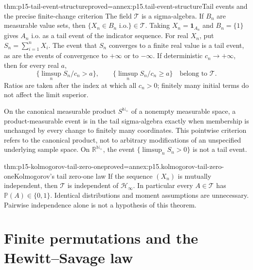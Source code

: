 \begin{hbtheorem}{thm:p15-tail-event-structure}{proved=annex:p15.tail-event-structure}{Tail events and the precise finite-change criterion}
The field \(\mathcal T\) is a sigma-algebra. If \(B_n\) are
measurable value sets, then \(\{X_n\in B_n\text{ i.o.}\}\in\mathcal T\).
Taking \(X_n=\mathbf1_{A_n}\) and \(B_n=\{1\}\) gives
\(A_n\text{ i.o.}\) as a tail event of the indicator sequence.
For real \(X_n\), put \(S_n=\sum_{i=1}^nX_i\). The event that
\(S_n\) converges to a finite real value is a tail event, as are
the events of convergence to \(+\infty\) or to \(-\infty\).
If deterministic \(c_n\to+\infty\), then for every real \(a\),
\[
 \{\limsup_n S_n/c_n>a\},\qquad
 \{\limsup_n S_n/c_n\geq a\}
                         \quad\text{belong to }\mathcal T.
\]
Ratios are taken after the index at which all \(c_n>0\);
finitely many initial terms do not affect the limit superior.

On the canonical measurable product \(S^{\mathbb N_+}\) of a
nonempty measurable space, a product-measurable event is in the tail
sigma-algebra exactly when membership is unchanged by every change
to finitely many coordinates. This pointwise criterion refers to
the canonical product, not to arbitrary modifications of an unspecified
underlying sample space.
On \(\mathbb R^{\mathbb N_+}\), the event
\(\{\limsup_n S_n>0\}\) is not a tail event.
\end{hbtheorem}

\begin{hbtheorem}{thm:p15-kolmogorov-tail-zero-one}{proved=annex:p15.kolmogorov-tail-zero-one}{Kolmogorov's tail zero-one law}
If the sequence \((X_n)\) is mutually independent, then
\(\mathcal T\) is independent of \(\mathcal H_\infty\).
In particular every \(A\in\mathcal T\) has
\(\mathbb P(A)\in\{0,1\}\).
Identical distributions and moment assumptions are unnecessary.
Pairwise independence alone is not a hypothesis of this theorem.
\end{hbtheorem}

\section{Finite permutations and the Hewitt--Savage law}
\label{sec:p15-hewitt-savage}

